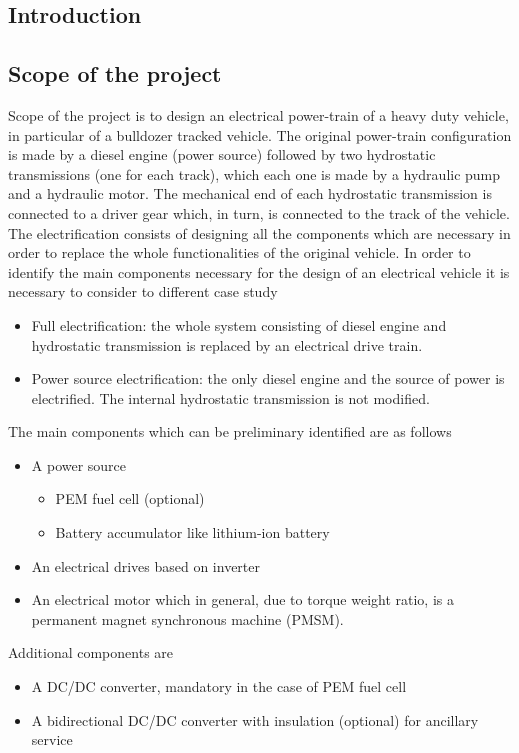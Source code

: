 \documentclass[11pt,a4paper,oneside]{book}
\begin{document}
\begin{onehalfspace}
\chapter{Introduction}
\section{Scope of the project}
Scope of the project is to design an electrical power-train of a heavy duty vehicle, in particular of a bulldozer tracked vehicle. The original power-train configuration is made by a diesel engine (power source) followed by two hydrostatic transmissions (one for each track), which each one is made by a hydraulic pump and a hydraulic motor.  The mechanical end of each hydrostatic transmission is connected to a driver gear which, in turn, is connected to the track of the vehicle. The electrification consists of designing all the components which are necessary in order to replace the whole functionalities of the original vehicle. In order to identify the main components necessary for the design of an electrical vehicle it is necessary to consider to different case study
\begin{itemize}
	\item[--] Full electrification: the whole system consisting of diesel engine and hydrostatic transmission is replaced by an electrical drive train. 
	\item[--] Power source electrification: the only diesel engine and the source of power is electrified. The internal hydrostatic transmission is not modified.
\end{itemize}
The main components which can be preliminary identified are as follows
\begin{itemize}
	\item[--] A power source 
		\begin{itemize}
			\item[--] PEM fuel cell (optional) 
			\item[--] Battery accumulator like lithium-ion battery	
		\end{itemize}
	\item[--] An electrical drives based on inverter 
	\item[--] An electrical motor which in general, due to torque weight ratio, is a permanent magnet synchronous machine (PMSM).
\end{itemize} 
Additional components are 
\begin{itemize}
	\item[--] A DC/DC converter, mandatory in the case of PEM fuel cell
	\item[--] A bidirectional DC/DC converter with insulation (optional) for ancillary service
\end{itemize}


\end{onehalfspace}
\end{document}
